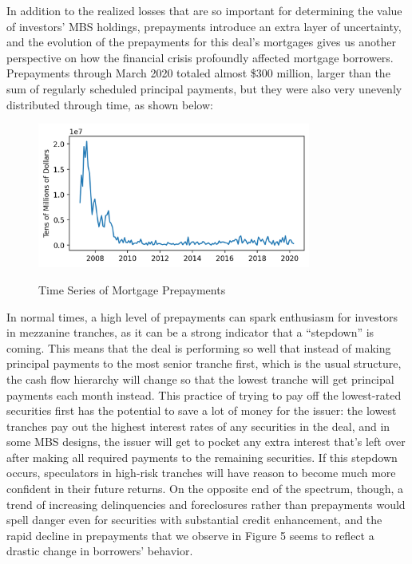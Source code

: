 \documentclass[12pt]{article}
\begin{document}
In addition to the realized losses that are so important for determining the value of investors’ MBS holdings, prepayments introduce an extra layer of uncertainty, and the evolution of the prepayments for this deal’s mortgages gives us another perspective on how the financial crisis profoundly affected mortgage borrowers. Prepayments through March 2020 totaled almost \$300 million, larger than the sum of regularly scheduled principal payments, but they were also very unevenly distributed through time, as shown below:

\begin{figure}[h]
	\centering
	\caption{Time Series of Mortgage Prepayments}
	\includegraphics[width=0.8\textwidth]{../figures/timeseries_prepayments}
	\label{fig:timeseries_prepayments}
\end{figure}

In normal times, a high level of prepayments can spark enthusiasm for investors in mezzanine tranches, as it can be a strong indicator that a “stepdown” is coming. This means that the deal is performing so well that instead of making principal payments to the most senior tranche first, which is the usual structure, the cash flow hierarchy will change so that the lowest tranche will get principal payments each month instead. This practice of trying to pay off the lowest-rated securities first has the potential to save a lot of money for the issuer: the lowest tranches pay out the highest interest rates of any securities in the deal, and in some MBS designs, the issuer will get to pocket any extra interest that’s left over after making all required payments to the remaining securities. If this stepdown occurs, speculators in high-risk tranches will have reason to become much more confident in their future returns. On the opposite end of the spectrum, though, a trend of increasing delinquencies and foreclosures rather than prepayments would spell danger even for securities with substantial credit enhancement, and the rapid decline in prepayments that we observe in Figure 5 seems to reflect a drastic change in borrowers’ behavior.
\end{document}
